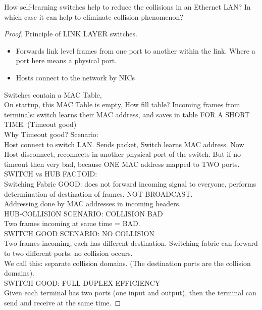 \documentclass[../main.tex]{subfiles}
\begin{document}
\begin{wts}
    How self-learning switches help to reduce the collisions in an Ethernet LAN? In which case it can help to eliminate collision phenomenon?
\end{wts}
\begin{proof}
Principle of LINK LAYER switches.
\begin{itemize}
\item Forwards link level frames from one port to another within the link. Where a port here means a physical port.
\item Hosts connect to the network by NICs
\end{itemize}

Switches contain a MAC Table,\\
On startup, this MAC Table is empty,
How fill table? Incoming frames from terminals: switch learns their MAC address, and saves in table FOR A SHORT TIME. (Timeout good)\\

Why Timeout good? Scenario:\\
Host connect to switch LAN. Sends packet, Switch learns MAC address. Now Host disconnect, reconnects in another physical port of the switch. But if no timeout then very bad, because ONE MAC address mapped to TWO ports.\\

SWITCH vs HUB FACTOID:\\
Switching Fabric GOOD: does not forward incoming signal to everyone, performs determination of destination of frames. NOT BROADCAST.\\

Addressing done by MAC addresses in incoming headers.\\

HUB-COLLISION SCENARIO: COLLISION BAD\\
Two frames incoming at same time = BAD.\\

SWITCH GOOD SCENARIO: NO COLLISION\\
Two frames incoming, each has different destination. Switching fabric can forward to two different ports. no collision occurs.\\
We call this: separate collision domains. (The destination ports are the collision domains).\\

SWITCH GOOD: FULL DUPLEX EFFICIENCY\\
Given each terminal has two ports (one input and output), then the terminal can send and receive at the same time.
\end{proof}\newpage
\end{document}
